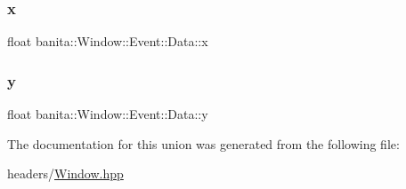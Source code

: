\subsubsection{\texorpdfstring{x}{x}}
{\footnotesize\ttfamily float banita\+::\+Window\+::\+Event\+::\+Data\+::x}

\mbox{\label{unionbanita_1_1_window_1_1_event_1_1_data_af609919ff8743923782aaa2ad5bf49ab}} 
\subsubsection{\texorpdfstring{y}{y}}
{\footnotesize\ttfamily float banita\+::\+Window\+::\+Event\+::\+Data\+::y}



The documentation for this union was generated from the following file\+:\begin{DoxyCompactItemize}
\item 
headers/\mbox{\hyperlink{_window_8hpp}{Window.\+hpp}}\end{DoxyCompactItemize}
